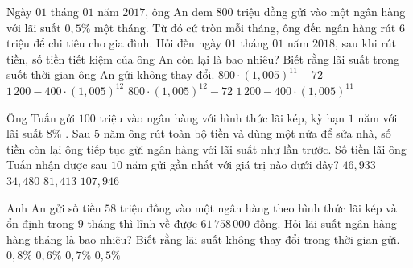 \begin{ex}%
	Ngày $01$ tháng $01$ năm $2017$, ông An đem $800$ triệu đồng gửi vào một ngân hàng với lãi suất $0{,}5\%$ một tháng. Từ đó cứ tròn  mỗi tháng, ông đến ngân hàng rút $6$ triệu để chi tiêu cho gia đình. Hỏi đến ngày $01$ tháng $01$ năm $2018$, sau khi rút tiền, số tiền tiết kiệm của ông An còn lại là bao nhiêu? Biết rằng lãi suất trong suốt thời gian ông An gửi không thay đổi.
	 \choice
		 {$800\cdot (1{,}005)^{11}-72$}
		{\True $1\,200-400\cdot  (1{,}005)^{12}$}
		{$800\cdot  (1{,}005)^{12}-72$}
		{$1\,200-400\cdot (1{,}005)^{11}$} 
\end{ex}

\begin{ex}%
	Ông Tuấn gửi $100$ triệu vào ngân hàng với hình thức lãi kép, kỳ hạn $1$ năm với lãi suất $8\%$ . Sau $5$ năm ông rút  toàn bộ tiền và dùng một nửa để sửa nhà, số tiền còn lại ông tiếp tục gửi ngân hàng với lãi suất như lần trước. Số tiền lãi ông Tuấn nhận được sau $10$ năm gửi gần nhất với giá trị nào dưới đây?
	\choice 
		{$46{,}933$} 
		 {$34{,}480$}
		{\True $81{,}413$} 
		{$107{,}946$} 
\end{ex}

\begin{ex}%
	Anh An gửi số tiền $58$ triệu đồng vào một ngân hàng theo hình thức lãi kép và ổn định trong $9$ tháng thì lĩnh về được  $61\,758\,000$ đồng. Hỏi lãi suất ngân hàng hàng tháng là bao nhiêu? Biết rằng lãi suất không thay đổi trong thời gian gửi.
	\choice 
		{$0{,}8\%$} 
		{$0{,}6\%$} 
		{\True $0{,}7\%$} 
		 {$0{,}5\%$}
\end{ex}

